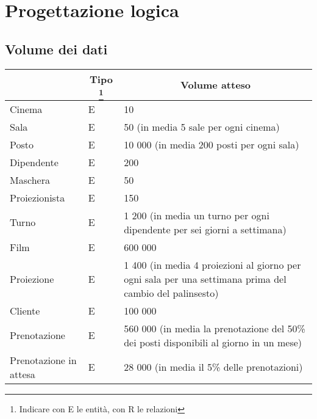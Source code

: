 \section{Progettazione logica}

\subsection*{Volume dei dati}
%
%
\begin{tabularx}{\linewidth}{|X|l|X|}
    \hline
    \rowcolor{tblhdrcolor}
    \multicolumn{1}{|c|}{\textbf{Concetto nello schema}}
     & \multicolumn{1}{|c|}{\textbf{Tipo}
        \footnote{Indicare con E le entità, con R le relazioni}}
     & \multicolumn{1}{|c|}{\textbf{Volume atteso}}
    \\\hline
    Cinema
     & E
     & 10
    \\\hline
    Sala
     & E
     & 50 (in media 5 sale per ogni cinema)
    \\ \hline
    Posto
     & E
     & 10 000 (in media 200 posti per ogni sala)
    \\ \hline
    Dipendente
     & E
     & 200
    \\ \hline
    Maschera
     & E
     & 50
    \\ \hline
    Proiezionista
     & E
     & 150
    \\ \hline
    Turno
     & E
     & 1 200 (in media un turno per ogni dipendente per sei giorni a settimana)
    \\ \hline
    Film
     & E
     & 600 000
    \\ \hline
    Proiezione
     & E
     & 1 400 (in media 4 proiezioni al giorno per ogni sala per una settimana
    prima del cambio del palinsesto)
    \\ \hline
    Cliente
     & E
     & 100 000
    \\ \hline
    Prenotazione
     & E
     & 560 000 (in media la prenotazione del 50\% dei posti disponibili al
    giorno in un mese)
    \\ \hline
    Prenotazione in attesa
     & E
     & 28 000 (in media il 5\% delle prenotazioni)
    \\ \hline

\end{tabularx}
